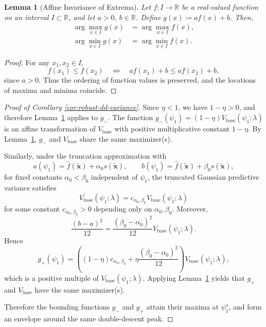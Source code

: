 \documentclass[12pt, english, oneside, a4paper]{article}
\newtheorem{lemma}[theorem]{Lemma}
\begin{document}
\begin{lemma}[Affine Invariance of Extrema]\label{lem:affine-invariance}
Let $f:I\to\mathbb{R}$ be a real-valued function on an interval $I\subset\mathbb{R}$,
and let $a>0$, $b\in\mathbb{R}$.
Define $g(x)\coloneqq a f(x)+b$.
Then,
\begin{align*}
    \arg\max_{x\in I} g(x)&=\arg\max_{x\in I} f(x),\\
\arg\min_{x\in I} g(x)&=\arg\min_{x\in I} f(x).
\end{align*}
\end{lemma}

\begin{proof}
For any $x_1,x_2\in I$,
\[
f(x_1)\le f(x_2)
\quad\Longleftrightarrow\quad
a f(x_1)+b\le a f(x_2)+b,
\]
since $a>0$. Thus the ordering of function values is preserved,
and the locations of maxima and minima coincide.
\end{proof}


\begin{proof}[Proof of Corollary \ref{cor:robust-dd-variance}]
Since $\eta<1$, we have $1-\eta>0$, and therefore Lemma~\ref{lem:affine-invariance} applies to $g_-$. The function $g_-(\psi_1)=(1-\eta)V_{\mathrm{base}}(\psi_1;\lambda)$
is an affine transformation of $V_{\mathrm{base}}$ with positive
multiplicative constant $1-\eta$. By Lemma~\ref{lem:affine-invariance},
$g_-$ and $V_{\mathrm{base}}$ share the same maximizer(s).

Similarly, under the truncation approximation with
\[
a(\psi_1)=\hat{f}(\tilde{\mathbf{x}})+\alpha_0 s(\tilde{\mathbf{x}}),
\qquad
b(\psi_1)=\hat{f}(\tilde{\mathbf{x}})+\beta_0 s(\tilde{\mathbf{x}}),
\]
for fixed constants $\alpha_0<\beta_0$ independent of $\psi_1$, the truncated Gaussian predictive variance satisfies
\[
V^\prime_{\mathrm{base}}(\psi_1;\lambda)
=
c_{\alpha_0,\beta_0} V_{\mathrm{base}}(\psi_1;\lambda)
\]
for some constant $c_{\alpha_0,\beta_0}>0$ depending only on $\alpha_0,\beta_0$.
Moreover,
\[
\frac{(b-a)^2}{12}
=
\frac{(\beta_0-\alpha_0)^2}{12} V_{\mathrm{base}}(\psi_1;\lambda).
\]
Hence
\[
g_+(\psi_1)
=
\left((1-\eta)c_{\alpha_0,\beta_0}
+
\eta\frac{(\beta_0-\alpha_0)^2}{12}\right)
V_{\mathrm{base}}(\psi_1;\lambda),
\]
which is a positive multiple of $V_{\mathrm{base}}(\psi_1;\lambda)$.
Applying Lemma~\ref{lem:affine-invariance} yields that $g_+$ and
$V_{\mathrm{base}}$ have the same maximizer(s).

Therefore the bounding functions $g_-$ and $g_+$ attain their maxima
at $\psi_1^\star$, and form an envelope around the same double-descent peak.
\end{proof}
\end{document}
